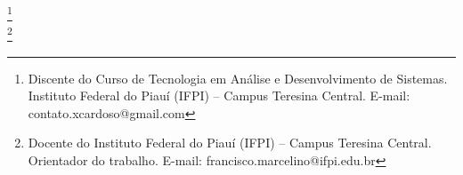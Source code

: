 
\imprimircapa

\imprimirfolhaderosto*

%



%

%


\begin{center}
    {\ABNTEXchapterfont\bfseries\MakeUppercase{\imprimirtitulo}}
\end{center}

\vspace{0.3cm} %

\flushright 
\autornomecompleto\footnote{Discente do Curso de Tecnologia em Análise e Desenvolvimento de Sistemas. Instituto Federal do Piauí (IFPI) -- Campus Teresina Central. E-mail: contato.xcardoso@gmail.com} \\
\profnomecompleto\footnote{Docente do Instituto Federal do Piauí (IFPI) -- Campus Teresina Central. Orientador do trabalho. E-mail: francisco.marcelino@ifpi.edu.br} \par 

\vspace{0.4cm} %

\justifying 





\vspace{0.3cm} %

